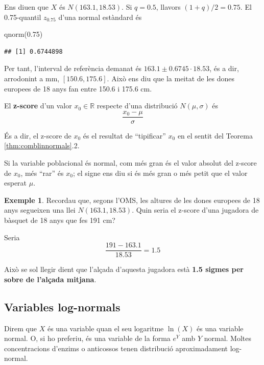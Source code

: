 \documentclass[
]{book}
\newenvironment{Shaded}{\begin{snugshade}}{\end{snugshade}}
\newcommand{\FloatTok}[1]{\textcolor[rgb]{0.00,0.00,0.81}{#1}}
\newcommand{\FunctionTok}[1]{\textcolor[rgb]{0.00,0.00,0.00}{#1}}
\newcommand{\NormalTok}[1]{#1}
\theoremstyle{definition}
\theoremstyle{definition}
\newtheorem{example}{Exemple}[chapter]
\theoremstyle{definition}
\theoremstyle{remark}
\begin{document}
Ens diuen que \(X\) és \(N(163.1,18.53)\). Si \(q=0.5\), llavors \((1+q)/2=0.75\). El 0.75-quantil \(z_{0.75}\) d'una normal estàndard és

\begin{Shaded}
\begin{Highlighting}[]
\FunctionTok{qnorm}\NormalTok{(}\FloatTok{0.75}\NormalTok{)}
\end{Highlighting}
\end{Shaded}

\begin{verbatim}
## [1] 0.6744898
\end{verbatim}

Per tant, l'interval de referència demanat és \(163.1\pm 0.6745\cdot 18.53\), és a dir, arrodonint a mm, \([150.6, 175.6]\). Això ens diu que la meitat de les dones europees de 18 anys fan entre 150.6 i 175.6 cm.

El \textbf{z-score} d'un valor \(x_0\in \mathbb{R}\) respecte d'una distribució \(N(\mu,\sigma)\) és
\[
\frac{x_0-\mu}{\sigma}
\]

És a dir, el z-score de \(x_0\) és el resultat de ``tipificar'' \(x_0\) en el sentit del Teorema \ref{thm:comblinnormals}.2.

Si la variable poblacional és normal, com més gran és el valor absolut del z-score de \(x_0\), més ``rar'' és \(x_0\); el signe ens diu si és més gran o més petit que el valor esperat \(\mu\).

\begin{example}
\protect\hypertarget{exm:unnamed-chunk-112}{}{\label{exm:unnamed-chunk-112} }Recordau que, segons l'OMS, les altures de les dones europees de 18 anys segueixen una llei \(N(163.1,18.53)\). Quin seria el z-score d'una jugadora de bàsquet de 18 anys que fes 191 cm?
\end{example}

Seria
\[ 
\frac{191-163.1}{18.53}=1.5
\]

Això se sol llegir dient que l'alçada d'aquesta jugadora està \textbf{1.5 sigmes per sobre de l'alçada mitjana}.

\hypertarget{variables-log-normals}{%
\subsection{Variables log-normals}\label{variables-log-normals}}

Direm que \(X\) és una variable  quan el seu logaritme \(\ln(X)\) és una variable normal. O, si ho preferiu, és una variable de la forma \(e^Y\) amb \(Y\) normal. Moltes concentracions d'enzims o anticossos tenen distribució aproximadament log-normal.
\end{document}
